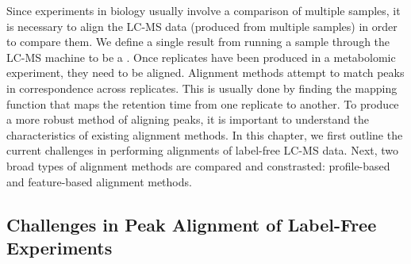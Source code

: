 Since experiments in biology usually involve a comparison of multiple samples, it is necessary to align the LC-MS data (produced from multiple samples) in order to compare them. We define a single result from running a sample through the LC-MS machine to be a . Once replicates have been produced in a metabolomic experiment, they need to be aligned. Alignment methods attempt to match peaks in correspondence across replicates. This is usually done by finding the mapping function that maps the retention time from one replicate to another. To produce a more robust method of aligning peaks, it is important to understand the characteristics of existing alignment methods. In this chapter, we first outline the current challenges in performing alignments of label-free LC-MS data. Next, two broad types of alignment methods are compared and constrasted: profile-based and feature-based alignment methods.

\subsection{\label{sec:Challenges-in-Peak}Challenges in Peak Alignment of Label-Free
Experiments}



